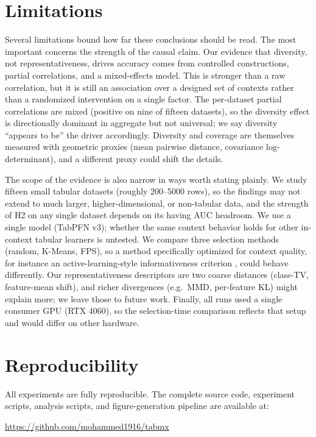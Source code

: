 \documentclass[11pt,a4paper]{article}
\begin{document}
\section{Limitations}

Several limitations bound how far these conclusions should be read. The most
important concerns the strength of the causal claim. Our evidence that diversity,
not representativeness, drives accuracy comes from controlled constructions,
partial correlations, and a mixed-effects model. This is stronger than a raw
correlation, but it is still an association over a designed set of contexts
rather than a randomized intervention on a single factor. The per-dataset partial
correlations are mixed (positive on nine of fifteen datasets), so the diversity
effect is directionally dominant in aggregate but not universal; we say diversity
``appears to be'' the driver accordingly. Diversity and coverage are themselves
measured with geometric proxies (mean pairwise distance, covariance
log-determinant), and a different proxy could shift the details.

The scope of the evidence is also narrow in ways worth stating plainly. We study
fifteen small tabular datasets (roughly 200--5000 rows), so the findings may not
extend to much larger, higher-dimensional, or non-tabular data, and the strength
of H2 on any single dataset depends on its having AUC headroom. We use a single
model (TabPFN v3); whether the same context behavior holds for other in-context
tabular learners is untested. We compare three selection methods (random,
K-Means, FPS), so a method specifically optimized for context quality, for
instance an active-learning-style informativeness criterion
\cite{settles2009active}, could behave differently. Our representativeness
descriptors are two coarse distances (class-TV, feature-mean shift), and richer
divergences (e.g.\ MMD, per-feature KL) might explain more; we leave those to
future work. Finally, all runs used a single consumer GPU (RTX 4060), so the
selection-time comparison reflects that setup and would differ on other hardware.

\section*{Reproducibility}

All experiments are fully reproducible. The complete source code, experiment
scripts, analysis scripts, and figure-generation pipeline are available at:

\begin{center}
\url{https://github.com/mohammed1916/tabmx}
\end{center}
\end{document}
